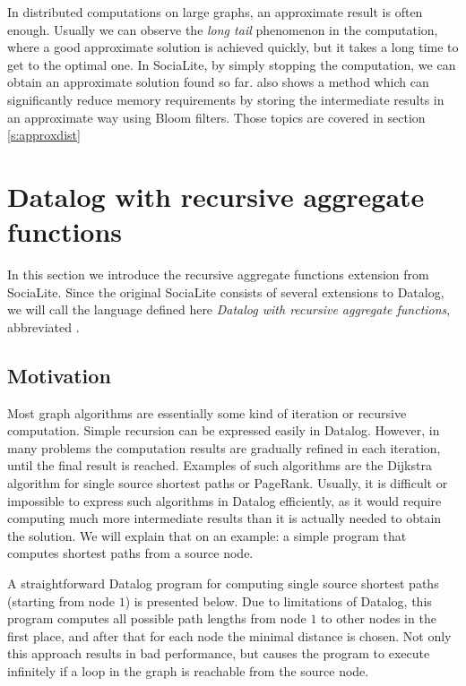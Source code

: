 In distributed computations on large graphs, an approximate result is often enough. Usually we can observe the \emph{long tail} phenomenon in the computation, where a good approximate solution is achieved quickly, but it takes a long time to get to the optimal one. In SociaLite, by simply stopping the computation, we can obtain an approximate solution found so far. \cite{distsoc} also shows a method which can significantly reduce memory requirements by storing the intermediate results in an approximate way using Bloom filters. Those topics are covered in section \ref{s:approxdist} 

\section{Datalog with recursive aggregate functions}\label{s:recaggr}

In this section we introduce the recursive aggregate functions extension from SociaLite. Since the original SociaLite consists of several extensions to Datalog, we will call the language defined here \emph{Datalog with recursive aggregate functions}, abbreviated \datalogra.

\subsection{Motivation}
Most graph algorithms are essentially some kind of iteration or recursive computation. Simple recursion can be expressed easily in Datalog. However, in many problems the computation results are gradually refined in each iteration, until the final result is reached. Examples of such algorithms are the Dijkstra algorithm for single source shortest paths or PageRank. Usually, it is difficult or impossible to express such algorithms in Datalog efficiently, as it would require computing much more intermediate results than it is actually needed to obtain the solution. We will explain that on an example: a simple program that computes shortest paths from a source node.

A straightforward Datalog program for computing single source shortest paths (starting from node $1$) is presented below. Due to limitations of Datalog, this program computes all possible path lengths from node $1$ to other nodes in the first place, and after that for each node the minimal distance is chosen. Not only this approach results in bad performance, but causes the program to execute infinitely if a loop in the graph is reachable from the source node. 

